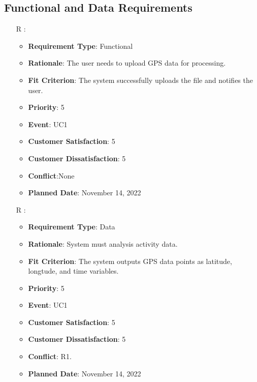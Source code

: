 \documentclass[12pt, titlepage]{article}
\newcounter{reqnum} %
\begin{document}
\subsection{Functional and Data Requirements}
\noindent \begin{itemize}

\item[R\refstepcounter{reqnum}\thereqnum
\label{R_Inputs_1}:] 
\begin{itemize}
    \item \textbf{Requirement Type}: Functional
    \item \textbf{Rationale}: The user needs to upload GPS data for processing.
    \item \textbf{Fit Criterion}: The system successfully uploads the file and notifies the user.
    \item \textbf{Priority}: 5
    \item \textbf{Event}: UC1
    \item \textbf{Customer Satisfaction}: 5
    \item \textbf{Customer Dissatisfaction}: 5
    \item \textbf{Conflict}:None
    \item \textbf{Planned Date}: November 14, 2022
\end{itemize}

\item[R\refstepcounter{reqnum}\thereqnum
\label{R_Inputs_1}:] 
\begin{itemize}
    \item \textbf{Requirement Type}: Data
    \item \textbf{Rationale}: System must analysis activity data.
    \item \textbf{Fit Criterion}: The system outputs GPS data points as latitude, longtude, and time variables. 
    \item \textbf{Priority}: 5
    \item \textbf{Event}: UC1
    \item \textbf{Customer Satisfaction}: 5
    \item \textbf{Customer Dissatisfaction}: 5
    \item \textbf{Conflict}: R1.
    \item \textbf{Planned Date}: November 14, 2022
\end{itemize}


\end{itemize}
\end{document}
